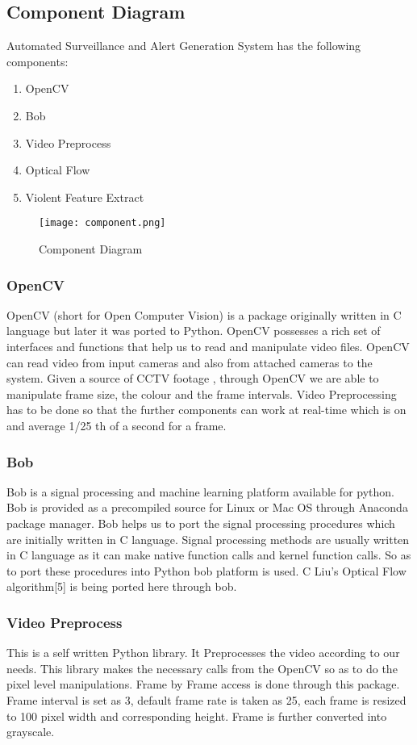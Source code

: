 \subsection{Component Diagram}
Automated Surveillance and Alert Generation System has the following components:
\begin{enumerate}
	\item OpenCV
	\item Bob
	\item Video Preprocess
	\item Optical Flow
	\item Violent Feature Extract
\end{enumerate}
\begin{center}
\begin{figure}[H]
\centering
\texttt{[image: component.png]}
\caption{Component Diagram}
\end{figure}
\end{center}
\subsubsection{OpenCV}
OpenCV (short for Open Computer Vision) is a package originally written in C language but later it was ported to Python. OpenCV possesses a rich set of interfaces and functions  that help us to read and manipulate video files. OpenCV can read video from input cameras and also from attached cameras to the system. Given a source of CCTV footage , through OpenCV we are able to manipulate frame size, the colour and the frame intervals. Video Preprocessing has to be done so that the further components can work at real-time which is on and average 1/25 th of a second for a frame.
\subsubsection{Bob}
Bob is a signal processing and machine learning platform available for python. Bob is provided as a precompiled source for Linux or Mac OS through Anaconda package manager. Bob helps us to port the signal processing procedures which are initially written in C language. Signal processing methods are usually written in C language as it can make native function calls and kernel function calls. So as to port these procedures into Python bob platform is used. C Liu's Optical Flow algorithm[5] is being ported here through bob.
\subsubsection{Video Preprocess}
This is a self written Python library. It Preprocesses the video according to our needs. This library makes the necessary calls from the OpenCV so as to do the pixel level manipulations. Frame by Frame access is done through this package. Frame interval is set as 3, default frame rate is taken as 25, each frame is resized to 100 pixel width and corresponding height. Frame is further converted into grayscale.
